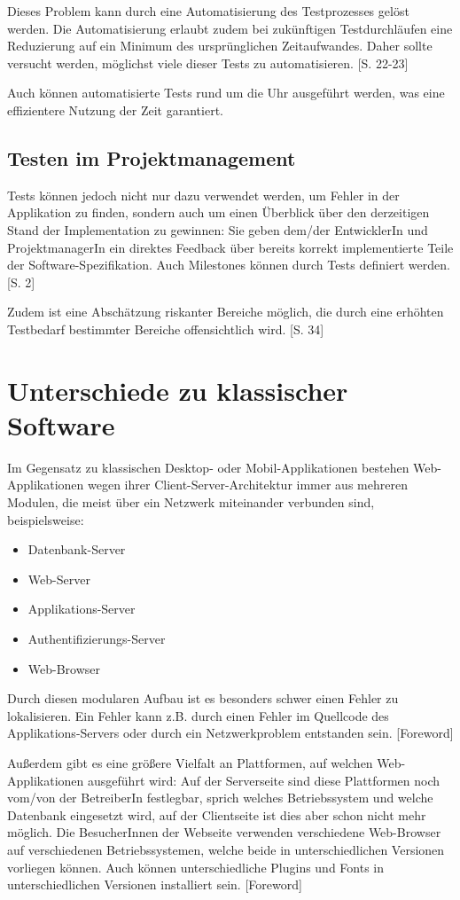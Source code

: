 \documentclass[a4paper,bibtotoc,oneside]{scrbook}
\begin{document}
Dieses Problem kann durch eine Automatisierung des Testprozesses gelöst werden. Die Automatisierung erlaubt zudem bei zukünftigen Testdurchläufen eine Reduzierung auf ein Minimum des ursprünglichen Zeitaufwandes. Daher sollte versucht werden, möglichst viele dieser Tests zu automatisieren. \cite{test_auto}[S. 22-23]

Auch können automatisierte Tests rund um die Uhr ausgeführt werden, was eine effizientere Nutzung der Zeit garantiert.

\section{Testen im Projektmanagement}
Tests können jedoch nicht nur dazu verwendet werden, um Fehler in der Applikation zu finden, sondern auch um einen Überblick über den derzeitigen Stand der Implementation zu gewinnen: Sie geben dem/der EntwicklerIn und ProjektmanagerIn ein direktes Feedback über bereits korrekt implementierte Teile der Software-Spezifikation. Auch Milestones können durch Tests definiert werden. \cite{test_auto}[S. 2]

Zudem ist eine Abschätzung riskanter Bereiche möglich, die durch eine erhöhten Testbedarf bestimmter Bereiche offensichtlich wird. \cite{testing_apps_on_web}[S. 34]

\chapter{Unterschiede zu klassischer Software}
Im Gegensatz zu klassischen Desktop- oder Mobil-Applikationen bestehen Web-Applikationen wegen ihrer Client-Server-Architektur immer aus mehreren Modulen, die meist über ein Netzwerk miteinander verbunden sind, beispielsweise: 

\begin{itemize}
\item Datenbank-Server
\item Web-Server
\item Applikations-Server
\item Authentifizierungs-Server
\item Web-Browser
\end{itemize}

Durch diesen modularen Aufbau ist es besonders schwer einen Fehler zu lokalisieren. Ein Fehler kann z.B. durch einen Fehler im Quellcode des Applikations-Servers oder durch ein Netzwerkproblem entstanden sein. \cite{testing_apps_on_web}[Foreword]

Außerdem gibt es eine größere Vielfalt an Plattformen, auf welchen Web-Applikationen ausgeführt wird: Auf der Serverseite sind diese Plattformen noch vom/von der BetreiberIn festlegbar, sprich welches Betriebssystem und welche Datenbank eingesetzt wird, auf der Clientseite ist dies aber schon nicht mehr möglich. Die BesucherInnen der Webseite verwenden verschiedene Web-Browser auf verschiedenen Betriebssystemen, welche beide in unterschiedlichen Versionen vorliegen können. Auch können unterschiedliche Plugins und Fonts in unterschiedlichen Versionen installiert sein. \cite{testing_apps_on_web}[Foreword]
\end{document}
